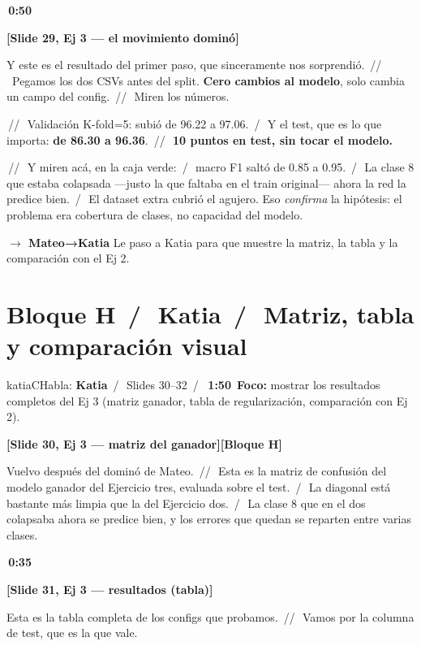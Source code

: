 \documentclass[11pt,a4paper]{article}
\newcommand{\slidenum}[1]{\textcolor{accent}{\textbf{[Slide #1]}}}
\newcommand{\timing}[1]{\textcolor{muted}{\textbf{\,#1\,}}}
\newcommand{\bloque}[1]{\textcolor{muted}{\small\textbf{[Bloque #1]}}}
\newcommand{\pausa}{\textcolor{muted}{\,/\,}}
\newcommand{\Pausa}{\textcolor{muted}{\,/\!/\,}}
\newcommand{\paso}[1]{\textcolor{accent}{\textbf{$\to$ #1}}}
\begin{document}
\timing{0:50}

\slidenum{29, Ej 3 — el movimiento dominó}

Y este es el resultado del primer paso, que sinceramente nos sorprendió. \Pausa\ Pegamos los dos CSVs antes del split. \textbf{Cero cambios al modelo}, solo cambia un campo del config. \Pausa\ Miren los números.

\Pausa\ Validación K-fold=5: subió de 96.22 a 97.06. \pausa\ Y el test, que es lo que importa: \textbf{de 86.30 a 96.36}. \Pausa\ \textbf{10 puntos en test, sin tocar el modelo.}

\Pausa\ Y miren acá, en la caja verde: \pausa\ macro F1 saltó de 0.85 a 0.95. \pausa\ La clase 8 que estaba colapsada ---justo la que faltaba en el train original--- ahora la red la predice bien. \pausa\ El dataset extra cubrió el agujero. Eso \emph{confirma} la hipótesis: el problema era cobertura de clases, no capacidad del modelo.

\paso{Mateo→Katia} \quad Le paso a Katia para que muestre la matriz, la tabla y la comparación con el Ej 2.

\section{Bloque H \pausa\ \textcolor{katiaC}{Katia} \pausa\ Matriz, tabla y comparación visual}\label{sec:bloqueH}

\begin{personabox}{katiaC}{Habla: \textcolor{katiaC}{\textbf{Katia}} \pausa\ Slides 30--32 \pausa\ \timing{1:50}}
\textbf{Foco:} mostrar los resultados completos del Ej 3 (matriz ganador, tabla de regularización, comparación con Ej 2).
\end{personabox}

\slidenum{30, Ej 3 — matriz del ganador}\quad \bloque{H}

Vuelvo después del dominó de Mateo. \Pausa\ Esta es la matriz de confusión del modelo ganador del Ejercicio tres, evaluada sobre el test. \pausa\ La diagonal está bastante más limpia que la del Ejercicio dos. \pausa\ La clase 8 que en el dos colapsaba ahora se predice bien, y los errores que quedan se reparten entre varias clases.

\timing{0:35}

\slidenum{31, Ej 3 — resultados (tabla)}

Esta es la tabla completa de los configs que probamos. \Pausa\ Vamos por la columna de test, que es la que vale.
\end{document}
